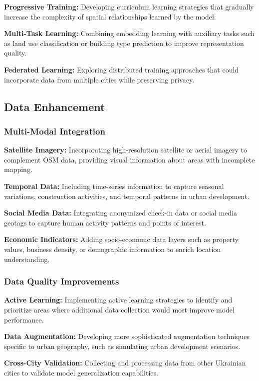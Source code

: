 \textbf{Progressive Training:} Developing curriculum learning strategies that gradually increase the complexity of spatial relationships learned by the model.

\textbf{Multi-Task Learning:} Combining embedding learning with auxiliary tasks such as land use classification or building type prediction to improve representation quality.

\textbf{Federated Learning:} Exploring distributed training approaches that could incorporate data from multiple cities while preserving privacy.

\subsection{Data Enhancement}

\subsubsection{Multi-Modal Integration}

\textbf{Satellite Imagery:} Incorporating high-resolution satellite or aerial imagery to complement OSM data, providing visual information about areas with incomplete mapping.

\textbf{Temporal Data:} Including time-series information to capture seasonal variations, construction activities, and temporal patterns in urban development.

\textbf{Social Media Data:} Integrating anonymized check-in data or social media geotags to capture human activity patterns and points of interest.

\textbf{Economic Indicators:} Adding socio-economic data layers such as property values, business density, or demographic information to enrich location understanding.

\subsubsection{Data Quality Improvements}

\textbf{Active Learning:} Implementing active learning strategies to identify and prioritize areas where additional data collection would most improve model performance.

\textbf{Data Augmentation:} Developing more sophisticated augmentation techniques specific to urban geography, such as simulating urban development scenarios.

\textbf{Cross-City Validation:} Collecting and processing data from other Ukrainian cities to validate model generalization capabilities.

